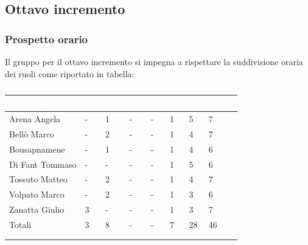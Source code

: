     \subsection{Ottavo incremento} 
    {
    \subsubsection{Prospetto orario}
    {
    Il gruppo per il ottavo incremento si impegna a rispettare la suddivisione oraria dei ruoli come riportato in tabella:
      \setlength{\freewidth}{\dimexpr\textwidth-30\tabcolsep}
      \renewcommand{\arraystretch}{1.0}
      \setlength{\aboverulesep}{0pt}
      \setlength{\belowrulesep}{0pt}
      \begin{longtable}{C{.4\freewidth} C{.1\freewidth} C{.1\freewidth} C{.1\freewidth} C{.1\freewidth} C{.1\freewidth} C{.1\freewidth} C{.1\freewidth} C{.1\freewidth}}
      \toprule
      \textcolor{white}{\textbf{Componente}}&
      \textcolor{white}{\textbf{Re}}&
      \textcolor{white}{\textbf{Am}}&
      \textcolor{white}{\textbf{An}}&
      \textcolor{white}{\textbf{Pt}}&
      \textcolor{white}{\textbf{Pr}}&
      \textcolor{white}{\textbf{Ve}}&
      \textcolor{white}{\textbf{Ore}}\\
      \toprule
      \endhead

      Arena Angela & - & 1 & -  & - & 1 & 5 & 7 \\      
      Bellò Marco & - & 2 & - & - & 1 & 4 & 7 \\      
      Bousapnamene & - & 1 & - & - & 1 & 4 & 6 \\      
      Di Fant Tommaso & - & - & - & - & 1 & 5 & 6 \\      
      Tossuto Matteo & - & 2 & - & - & 1 & 4 & 7 \\      
      Volpato Marco & - & 2 & - & - & 1 & 3 & 6 \\      
      Zanatta Giulio & 3 & - & - & - & 1 & 3 & 7 \\      
      Totali & 3 & 8 & - & - & 7 & 28 & 46 \\
      \bottomrule  
      \\
      \caption{}

      \end{longtable} 

}}
